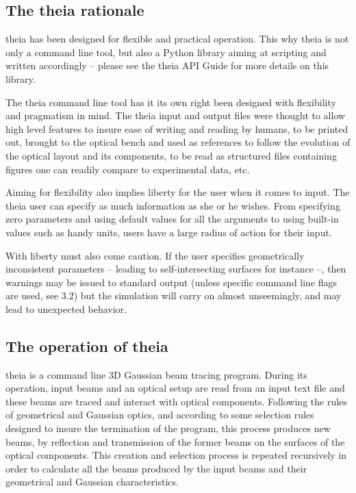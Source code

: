 \documentclass{article}
\begin{document}
\subsection{The theia rationale}
theia has been designed for flexible and practical operation. This why theia is not only a command line tool, but also a Python library aiming at scripting and written accordingly -- please see the theia API Guide for more details on this library. 

The theia command line tool has it its own right been designed with flexibility and pragmatism in mind. The theia input and output files were thought to allow high level features to insure ease of writing and reading by humans, to be printed out, brought to the optical bench and used as references to follow the evolution of the optical layout and its components, to be read as structured files containing figures one can readily compare to experimental data, etc.

Aiming for flexibility also implies liberty for the user when it comes to input. The theia user can specify as much information as she or he wishes. From specifying zero parameters and using default values for all the arguments to using built-in values such as handy units, users have a large radius of action for their input.

With liberty must also come caution. If the user specifies geometrically inconsistent parameters -- leading to self-intersecting surfaces for instance --, then warnings may be issued to standard output (unless specific command line flags are used, see 3.2) but the simulation will carry on almost unseemingly, and may lead to unexpected behavior. 

\subsection{The operation of theia}
theia is a command line 3D Gaussian beam tracing program. During its operation, input beams and an optical setup are read from an input text file and these beams are traced and interact with optical components. Following the rules of geometrical and Gaussian optics, and according to some selection rules designed to insure the termination of the program, this process produces new beams, by reflection and transmission of the former beams on the surfaces of the optical components. This creation and selection process is repeated recursively in order to calculate all the beams produced by the input beams and their geometrical and Gaussian characteristics. 
\end{document}
